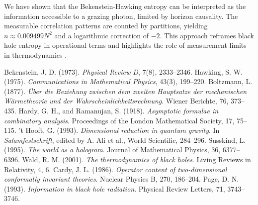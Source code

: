 \documentclass[12pt, letterpaper]{article}
\begin{document}
We have shown that the Bekenstein-Hawking entropy can be interpreted as the information accessible to a grazing photon, limited by horizon causality. The measurable correlation patterns are counted by partitions, yielding $n \approx 0.009499 N^2$ and a logarithmic correction of $-2$. This approach reframes black hole entropy in operational terms and highlights the role of measurement limits in thermodynamics \cite{boltzmann1877}.

\begin{thebibliography}{9}
 Bekenstein, J. D. (1973). \textit{Physical Review D}, 7(8), 2333–2346.
 Hawking, S. W. (1975). \textit{Communications in Mathematical Physics}, 43(3), 199–220.
 Boltzmann, L. (1877). \textit{Über die Beziehung zwischen dem zweiten Hauptsatze der mechanischen Wärmetheorie und der Wahrscheinlichkeitsrechnung}. Wiener Berichte, 76, 373–435.
 Hardy, G. H., and Ramanujan, S. (1918). \textit{Asymptotic formulae in combinatory analysis}. Proceedings of the London Mathematical Society, 17, 75–115.
 't Hooft, G. (1993). \textit{Dimensional reduction in quantum gravity}. In \textit{Salamfestschrift}, edited by A. Ali et al., World Scientific, 284–296.
 Susskind, L. (1995). \textit{The world as a hologram}. Journal of Mathematical Physics, 36, 6377–6396.
 Wald, R. M. (2001). \textit{The thermodynamics of black holes}. Living Reviews in Relativity, 4, 6.
 Cardy, J. L. (1986). \textit{Operator content of two-dimensional conformally invariant theories}. Nuclear Physics B, 270, 186–204.
 Page, D. N. (1993). \textit{Information in black hole radiation}. Physical Review Letters, 71, 3743–3746.
\end{thebibliography}
\end{document}
